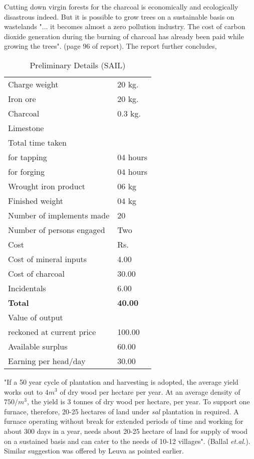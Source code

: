 Cutting down virgin forests for the charcoal is economically and ecologically disastrous indeed. But it is possible to grow trees on a sustainable basis on wastelands "... it becomes almost a zero pollution industry. The cost of carbon dioxide generation during the burning of charcoal has already been paid while growing the trees". (page 96 of report). The report further concludes, 

{\fontsize{9}{11}\selectfont\begin{longtable}{|l|l|}
\captionsetup{font=small}
\caption{Preliminary Details (SAIL)}\label{table 8.3}\\
\hline
Charge weight & 20 kg.\\
\hline
Iron ore & 20 kg.\\
\hline
Charcoal & 0.3 kg.\\
\hline
Limestone & \\
\hline
Total time taken & \\
\hline
for tapping & 04 hours\\
\hline
for forging & 04 hours\\
\hline
Wrought iron product  & 06 kg\\
\hline
Finished weight & 04 kg\\
\hline
Number of implements made & 20\\
\hline
Number of persons engaged& Two\\
\hline
Cost & Rs.\\
\hline
Cost of mineral inputs & 4.00\\
\hline
Cost of charcoal & 30.00\\
\hline
Incidentals & 6.00\\
\hline
\textbf{Total} & \textbf{40.00}\\
\hline
Value of output & \\
\hline
reckoned at current price & 100.00\\
\hline
Available surplus & 60.00\\
\hline
Earning per head/day & 30.00\\
\hline
\end{longtable}}

\vspace{-.2cm}


"If a 50 year cycle of plantation and harvesting is adopted, the average yield works out to $4m^3$ of dry wood per hectare per year. At an average density of $750/m^3$, the yield is 3 tonnes of dry wood per hectare, per year. To support one furnace, therefore, 20-25 hectares of land under {\it sal} plantation in required. A furnace operating without break for extended periods of time and working for about 300 days in a year, needs about 20-25 hectare of land for supply of wood on a sustained basis and can cater to the needs of 10-12 villages". (Ballal {\it et.al.}). Similar suggestion was offered by Leuva as pointed earlier.

